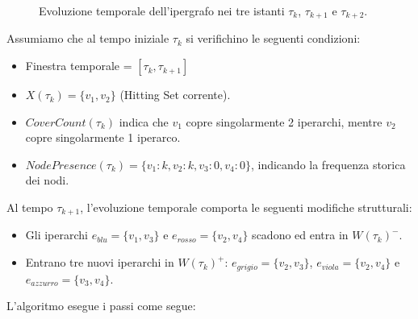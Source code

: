 \begin{figure}[htbp]
\caption{Evoluzione temporale dell'ipergrafo nei tre istanti $\tau_k$, $\tau_{k+1}$ e $\tau_{k+2}$.}
\label{fig:ipergrafo_temporale}
\end{figure}
Assumiamo che al tempo iniziale $\tau_k$ si verifichino le seguenti condizioni:
\begin{itemize}
    \item Finestra temporale = $[\tau_k, \tau_{k+1}]$
    \item $X(\tau_k) = \{v_1, v_2\}$ (Hitting Set corrente).
    \item $CoverCount(\tau_k)$ indica che $v_1$ copre singolarmente 2 iperarchi, mentre $v_2$ copre singolarmente 1 iperarco.
    \item $NodePresence(\tau_k) = \{v_1: k, v_2: k, v_3: 0, v_4: 0\}$, indicando la frequenza storica dei nodi.
\end{itemize}

Al tempo $\tau_{k+1}$, l'evoluzione temporale comporta le seguenti modifiche strutturali:
\begin{itemize}
    \item Gli iperarchi $e_{blu} = \{v_1, v_3\}$ e $e_{rosso} = \{v_2, v_4\}$ scadono ed entra in $W(\tau_k)^-$.
    \item Entrano tre nuovi iperarchi in $W(\tau_k)^+$: $e_{grigio} = \{v_2, v_3\}$,  $e_{viola} = \{v_2, v_4\}$ e $e_{azzurro} = \{v_3, v_4\}$.
\end{itemize}

L'algoritmo esegue i passi come segue:

